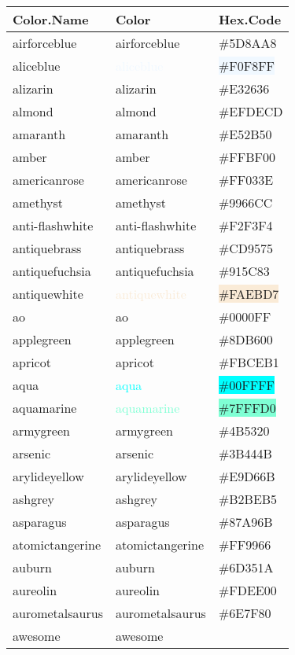 \documentclass[
]{article}
\begin{document}
\begin{longtable}[]{@{}lll@{}}
\toprule
Color.Name & Color & Hex.Code\tabularnewline
\midrule
\endhead
airforceblue & \textcolor{airforceblue}{airforceblue} &
\colorbox{airforceblue}{\#5D8AA8}\tabularnewline
aliceblue & \textcolor{aliceblue}{aliceblue} &
\colorbox{aliceblue}{\#F0F8FF}\tabularnewline
alizarin & \textcolor{alizarin}{alizarin} &
\colorbox{alizarin}{\#E32636}\tabularnewline
almond & \textcolor{almond}{almond} &
\colorbox{almond}{\#EFDECD}\tabularnewline
amaranth & \textcolor{amaranth}{amaranth} &
\colorbox{amaranth}{\#E52B50}\tabularnewline
amber & \textcolor{amber}{amber} &
\colorbox{amber}{\#FFBF00}\tabularnewline
americanrose & \textcolor{americanrose}{americanrose} &
\colorbox{americanrose}{\#FF033E}\tabularnewline
amethyst & \textcolor{amethyst}{amethyst} &
\colorbox{amethyst}{\#9966CC}\tabularnewline
anti-flashwhite & \textcolor{anti-flashwhite}{anti-flashwhite} &
\colorbox{anti-flashwhite}{\#F2F3F4}\tabularnewline
antiquebrass & \textcolor{antiquebrass}{antiquebrass} &
\colorbox{antiquebrass}{\#CD9575}\tabularnewline
antiquefuchsia & \textcolor{antiquefuchsia}{antiquefuchsia} &
\colorbox{antiquefuchsia}{\#915C83}\tabularnewline
antiquewhite & \textcolor{antiquewhite}{antiquewhite} &
\colorbox{antiquewhite}{\#FAEBD7}\tabularnewline
ao & \textcolor{ao}{ao} & \colorbox{ao}{\#0000FF}\tabularnewline
applegreen & \textcolor{applegreen}{applegreen} &
\colorbox{applegreen}{\#8DB600}\tabularnewline
apricot & \textcolor{apricot}{apricot} &
\colorbox{apricot}{\#FBCEB1}\tabularnewline
aqua & \textcolor{aqua}{aqua} & \colorbox{aqua}{\#00FFFF}\tabularnewline
aquamarine & \textcolor{aquamarine}{aquamarine} &
\colorbox{aquamarine}{\#7FFFD0}\tabularnewline
armygreen & \textcolor{armygreen}{armygreen} &
\colorbox{armygreen}{\#4B5320}\tabularnewline
arsenic & \textcolor{arsenic}{arsenic} &
\colorbox{arsenic}{\#3B444B}\tabularnewline
arylideyellow & \textcolor{arylideyellow}{arylideyellow} &
\colorbox{arylideyellow}{\#E9D66B}\tabularnewline
ashgrey & \textcolor{ashgrey}{ashgrey} &
\colorbox{ashgrey}{\#B2BEB5}\tabularnewline
asparagus & \textcolor{asparagus}{asparagus} &
\colorbox{asparagus}{\#87A96B}\tabularnewline
atomictangerine & \textcolor{atomictangerine}{atomictangerine} &
\colorbox{atomictangerine}{\#FF9966}\tabularnewline
auburn & \textcolor{auburn}{auburn} &
\colorbox{auburn}{\#6D351A}\tabularnewline
aureolin & \textcolor{aureolin}{aureolin} &
\colorbox{aureolin}{\#FDEE00}\tabularnewline
aurometalsaurus & \textcolor{aurometalsaurus}{aurometalsaurus} &
\colorbox{aurometalsaurus}{\#6E7F80}\tabularnewline
awesome & \textcolor{awesome}{awesome} &

\end{longtable}
\end{document}
